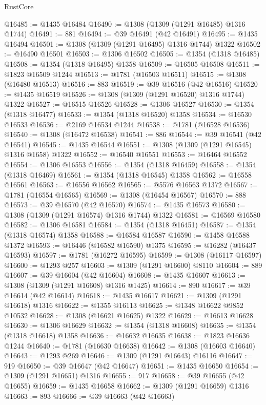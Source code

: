 \begin{lexlean}{RustCore}
\begin{coremodule}
@16485 := @1435 @16484
@16490 := @1308 (@1309 (@1291 @16485) @1316 @1744)
@16491 := 881
@16494 := @39 @16491 (@42 @16491)
@16495 := @1435 @16494
@16501 := @1308 (@1309 (@1291 @16495) @1316 @1744) @1322
@16502 := @16490 @16501
@16503 := @1306 @16502
@16505 := @1354 (@1318 @16485)
@16508 := @1354 (@1318 @16495) @1358
@16509 := @16505 @16508
@16511 := @1823 @16509 @1244
@16513 := @1781 (@16503 @16511)
@16515 := @1308 (@16480 @16513)
@16516 := 883
@16519 := @39 @16516 (@42 @16516)
@16520 := @1435 @16519
@16526 := @1308 (@1309 (@1291 @16520) @1316 @1744) @1322
@16527 := @16515 @16526
@16528 := @1306 @16527
@16530 := @1354 (@1318 @16477)
@16533 := @1354 (@1318 @16520) @1358
@16534 := @16530 @16533
@16536 := @2169 @16534 @1244
@16538 := @1781 (@16528 @16536)
@16540 := @1308 (@16472 @16538)
@16541 := 886
@16544 := @39 @16541 (@42 @16541)
@16545 := @1435 @16544
@16551 := @1308 (@1309 (@1291 @16545) @1316 @1658) @1322
@16552 := @16540 @16551
@16553 := @16464 @16552
@16554 := @1306 @16553
@16556 := @1354 (@1318 @16459)
@16558 := @1354 (@1318 @16469)
@16561 := @1354 (@1318 @16545) @1358
@16562 := @16558 @16561
@16563 := @16556 @16562
@16565 := @5576 @16563 @1372
@16567 := @1781 (@16554 @16565)
@16569 := @1308 (@16454 @16567)
@16570 := 888
@16573 := @39 @16570 (@42 @16570)
@16574 := @1435 @16573
@16580 := @1308 (@1309 (@1291 @16574) @1316 @1744) @1322
@16581 := @16569 @16580
@16582 := @1306 @16581
@16584 := @1354 (@1318 @16451)
@16587 := @1354 (@1318 @16574) @1358
@16588 := @16584 @16587
@16590 := @1458 @16588 @1372
@16593 := @16446 (@16582 @16590) @1375
@16595 := @16282 (@16437 @16593)
@16597 := @1781 (@16272 @16595)
@16599 := @1308 (@16117 @16597)
@16600 := @1293 @257
@16603 := @1309 (@1291 @16600) @8110
@16604 := 889
@16607 := @39 @16604 (@42 @16604)
@16608 := @1435 @16607
@16613 := @1308 (@1309 (@1291 @16608) @1316 @1425)
@16614 := 890
@16617 := @39 @16614 (@42 @16614)
@16618 := @1435 @16617
@16621 := @1309 (@1291 @16618) @1316
@16622 := @1355 @16113
@16625 := @1348 @16622 @9852 @10532
@16628 := @1308 (@16621 @16625) @1322
@16629 := @16613 @16628
@16630 := @1306 @16629
@16632 := @1354 (@1318 @16608)
@16635 := @1354 (@1318 @16618) @1358
@16636 := @16632 @16635
@16638 := @1823 @16636 @1244
@16640 := @1781 (@16630 @16638)
@16642 := @1308 (@16603 @16640)
@16643 := @1293 @269
@16646 := @1309 (@1291 @16643) @16116
@16647 := 919
@16650 := @39 @16647 (@42 @16647)
@16651 := @1435 @16650
@16654 := @1309 (@1291 @16651) @1316
@16655 := 917
@16658 := @39 @16655 (@42 @16655)
@16659 := @1435 @16658
@16662 := @1309 (@1291 @16659) @1316
@16663 := 893
@16666 := @39 @16663 (@42 @16663)

\end{coremodule}
\end{lexlean}
